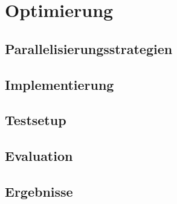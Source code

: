 \chapter{Optimierung}


\section{Parallelisierungsstrategien}
\section{Implementierung}
\section{Testsetup}
\section{Evaluation}
\section{Ergebnisse}